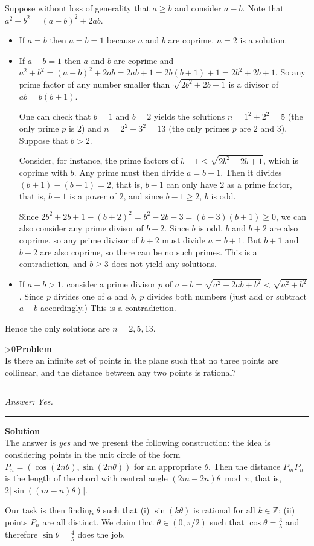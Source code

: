 \documentclass[12pt,oneside,a4paper]{book}
\newcounter{probnum}
\newcounter{solnum}
\newcommand{\prob}{\ifnum\value{probnum}>0\newpage\fi\setcounter{solnum}{0}\stepcounter{probnum}\textbf{Problem \theprobnum}\\}
\newcommand{\ans}{\medskip\hrule\medbreak\emph{Answer: }}
\newcommand{\soln}{\stepcounter{solnum}\medskip\hrule\medbreak\textbf{Solution \thesolnum}\\}
\begin{document}
Suppose without loss of generality that $a\ge b$ and consider $a-b$. Note that $a^2+b^2 = (a-b)^2 + 2ab$.
\begin{itemize}
\item If $a = b$ then $a=b=1$ because $a$ and $b$ are coprime. $n=2$ is a solution.
\item If $a - b = 1$ then $a$ and $b$ are coprime and $a^2+b^2 = (a-b)^2 + 2ab = 2ab+1 = 2b(b+1) + 1 = 2b^2+2b+1$. So any prime factor of any number smaller than $\sqrt{2b^2+2b+1}$ is a divisor of $ab = b(b+1)$.

One can check that $b=1$ and $b=2$ yields the solutions $n=1^2+2^2=5$ (the only prime $p$ is $2$) and $n=2^2+3^2=13$ (the only primes $p$ are $2$ and $3$). Suppose that $b>2$.

Consider, for instance, the prime factors of $b-1\le \sqrt{2b^2+2b+1}$, which is coprime with $b$. Any prime must then divide $a=b+1$. Then it divides $(b+1)-(b-1)=2$, that is, $b-1$ can only have $2$ as a prime factor, that is, $b-1$ is a power of $2$, and since $b-1\ge 2$, $b$ is odd.

Since $2b^2+2b+1 - (b+2)^2 = b^2-2b-3 = (b-3)(b+1) \ge 0$, we can also consider any prime divisor of $b+2$. Since $b$ is odd, $b$ and $b+2$ are also coprime, so any prime divisor of $b+2$ must divide $a=b+1$. But $b+1$ and $b+2$ are also coprime, so there can be no such primes. This is a contradiction, and $b\ge 3$ does not yield any solutions.
\item If $a-b>1$, consider a prime divisor $p$ of $a-b = \sqrt{a^2-2ab+b^2} < \sqrt{a^2+b^2}$. Since $p$ divides one of $a$ and $b$, $p$ divides both numbers (just add or subtract $a-b$ accordingly.) This is a contradiction.
\end{itemize}

Hence the only solutions are $n=2,5,13$.

\prob Is there an infinite set of points in the plane such that no three points are collinear, and the distance between any two points is rational?

\ans \emph{Yes.}

\soln
The answer is \emph{yes} and we present the following construction: the idea is considering points in the unit circle of the form $P_n = (\cos(2n\theta),\sin(2n\theta))$ for an appropriate $\theta$. Then the distance $P_mP_n$ is the length of the chord with central angle $(2m-2n)\theta\bmod\pi$, that is, $2|\sin((m-n)\theta)|$.

Our task is then finding $\theta$ such that (i) $\sin(k\theta)$ is rational for all $k\in\mathbb{Z}$; (ii) points $P_n$ are all distinct. We claim that $\theta \in (0,\pi/2)$ such that $\cos\theta = \frac35$ and therefore $\sin\theta = \frac45$ does the job.
\end{document}
